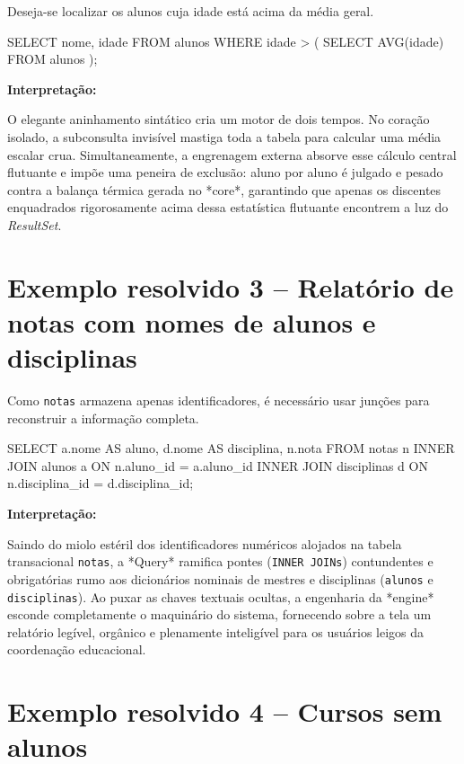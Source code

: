 Deseja-se localizar os alunos cuja idade está acima da média geral.

\begin{sqlcode}
SELECT nome, idade
FROM alunos
WHERE idade > (
    SELECT AVG(idade)
    FROM alunos
);
\end{sqlcode}

\textbf{Interpretação:}

O elegante aninhamento sintático cria um motor de dois tempos. No coração isolado, a subconsulta invisível mastiga toda a tabela para calcular uma média escalar crua. Simultaneamente, a engrenagem externa absorve esse cálculo central flutuante e impõe uma peneira de exclusão: aluno por aluno é julgado e pesado contra a balança térmica gerada no *core*, garantindo que apenas os discentes enquadrados rigorosamente acima dessa estatística flutuante encontrem a luz do \textit{ResultSet}.

\section{Exemplo resolvido 3 -- Relatório de notas com nomes de alunos e disciplinas}

Como \texttt{notas} armazena apenas identificadores, é necessário usar junções para reconstruir a informação completa.

\begin{sqlcode}
SELECT a.nome AS aluno,
       d.nome AS disciplina,
       n.nota
FROM notas n
INNER JOIN alunos a
    ON n.aluno_id = a.aluno_id
INNER JOIN disciplinas d
    ON n.disciplina_id = d.disciplina_id;
\end{sqlcode}

\textbf{Interpretação:}

Saindo do miolo estéril dos identificadores numéricos alojados na tabela transacional \texttt{notas}, a *Query* ramifica pontes (\texttt{INNER JOINs}) contundentes e obrigatórias rumo aos dicionários nominais de mestres e disciplinas (\texttt{alunos} e \texttt{disciplinas}). Ao puxar as chaves textuais ocultas, a engenharia da *engine* esconde completamente o maquinário do sistema, fornecendo sobre a tela um relatório legível, orgânico e plenamente inteligível para os usuários leigos da coordenação educacional.

\section{Exemplo resolvido 4 -- Cursos sem alunos}

